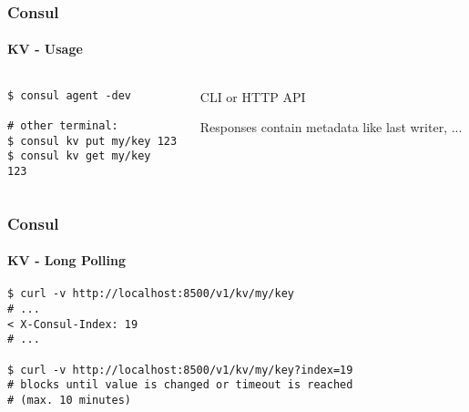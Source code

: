 \begin{frame}[fragile]
	\frametitle{Consul}
	\framesubtitle{KV - Usage}

	\begin{columns}[t]
		\begin{column}{0.45\textwidth}
			\begin{verbatim}
$ consul agent -dev

# other terminal:
$ consul kv put my/key 123
$ consul kv get my/key
123
			\end{verbatim}
		\end{column}
		\begin{column}{0.55\textwidth}
			CLI or HTTP API

			Responses contain metadata like last writer, ...
		\end{column}
	\end{columns}
\end{frame}

\begin{frame}[fragile]
	\frametitle{Consul}
	\framesubtitle{KV - Long Polling}
	\begin{verbatim}
$ curl -v http://localhost:8500/v1/kv/my/key
# ...
< X-Consul-Index: 19
# ...

$ curl -v http://localhost:8500/v1/kv/my/key?index=19
# blocks until value is changed or timeout is reached
# (max. 10 minutes)
	\end{verbatim}
\end{frame}
